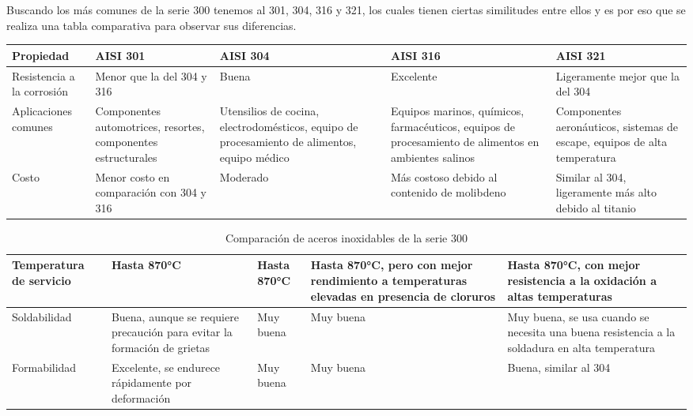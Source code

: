 \documentclass[14pt,oneside]{extarticle} %
\begin{document}
Buscando los más comunes de la serie 300 tenemos al 301, 304, 316 y 321, los cuales tienen ciertas similitudes entre ellos y es por eso que se realiza una tabla comparativa para observar sus diferencias.


\begin{table}[H]
    \centering
    \begin{tabularx}{\textwidth}{|X|X|X|X|X|}
        \hline
        Propiedad & AISI 301 & AISI 304 & AISI 316 & AISI 321\\
        \hline
        Resistencia a la corrosión & Menor que la del 304 y 316 & Buena & Excelente & Ligeramente mejor que la del 304\\
        \hline
        Aplicaciones comunes & Componentes automotrices, resortes, componentes estructurales & Utensilios de cocina, electrodomésticos, equipo de procesamiento de alimentos, equipo médico & Equipos marinos, químicos, farmacéuticos, equipos de procesamiento de alimentos en ambientes salinos & Componentes aeronáuticos, sistemas de escape, equipos de alta temperatura\\
        \hline
        Costo & Menor costo en comparación con 304 y 316 & Moderado & Más costoso debido al contenido de molibdeno & Similar al 304, ligeramente más alto debido al titanio\\
        \hline
    \end{tabularx}
\end{table}

\begin{table}[H]
    \centering
    \begin{tabularx}{\textwidth}{|X|X|X|X|X|}
        \hline        
        Temperatura de servicio & Hasta 870°C & Hasta 870°C & Hasta 870°C, pero con mejor rendimiento a temperaturas elevadas en presencia de cloruros & Hasta 870°C, con mejor resistencia a la oxidación a altas temperaturas\\
        \hline
        Soldabilidad & Buena, aunque se requiere precaución para evitar la formación de grietas & Muy buena & Muy buena & Muy buena, se usa cuando se necesita una buena resistencia a la soldadura en alta temperatura\\
        \hline
        Formabilidad & Excelente, se endurece rápidamente por deformación & Muy buena & Muy buena & Buena, similar al 304\\
        \hline
    \end{tabularx}
    \caption{Comparación de aceros inoxidables de la serie 300}
    \label{tab:aisi_300}
\end{table}
\end{document}
